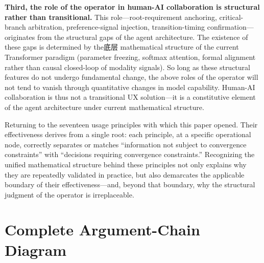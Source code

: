 \documentclass[11pt,a4paper]{article}
\theoremstyle{definition}
\begin{document}
\textbf{Third, the role of the operator in human-AI collaboration is structural rather than transitional.} This role---root-requirement anchoring, critical-branch arbitration, preference-signal injection, transition-timing confirmation---originates from the structural gaps of the agent architecture. The existence of these gaps is determined by the底层 mathematical structure of the current Transformer paradigm (parameter freezing, softmax attention, formal alignment rather than causal closed-loop of modality signals). So long as these structural features do not undergo fundamental change, the above roles of the operator will not tend to vanish through quantitative changes in model capability. Human-AI collaboration is thus not a transitional UX solution---it is a constitutive element of the agent architecture under current mathematical structure.

Returning to the seventeen usage principles with which this paper opened. Their effectiveness derives from a single root: each principle, at a specific operational node, correctly separates or matches ``information not subject to convergence constraints'' with ``decisions requiring convergence constraints.'' Recognizing the unified mathematical structure behind these principles not only explains why they are repeatedly validated in practice, but also demarcates the applicable boundary of their effectiveness---and, beyond that boundary, why the structural judgment of the operator is irreplaceable.

\appendix

\section{Complete Argument-Chain Diagram}
\end{document}
